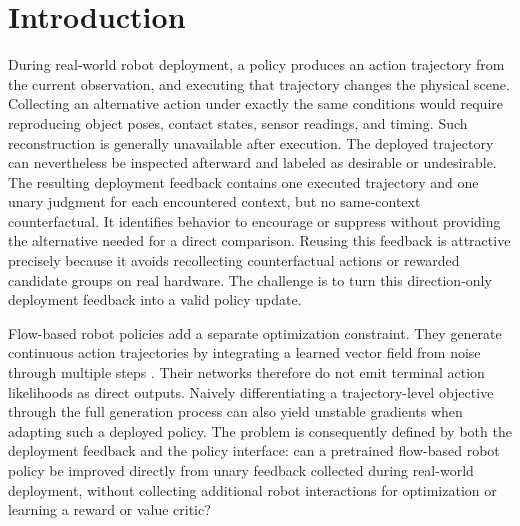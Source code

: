 \section{Introduction}

During real-world robot deployment, a policy produces an action trajectory from
the current observation, and executing that trajectory changes the physical
scene. Collecting an alternative action under exactly the same conditions would
require reproducing object poses, contact states, sensor readings, and timing.
Such reconstruction is generally unavailable after execution. The deployed
trajectory can nevertheless be inspected afterward and labeled as desirable or
undesirable. The resulting deployment feedback contains one executed trajectory
and one unary judgment for each encountered context, but no same-context
counterfactual. It identifies behavior to encourage or suppress without
providing the alternative needed for a direct comparison. Reusing this feedback
is attractive precisely because it avoids recollecting counterfactual actions
or rewarded candidate groups on real hardware. The challenge is to turn this
direction-only deployment feedback into a valid policy update.

Flow-based robot policies add a separate optimization constraint. They generate
continuous action trajectories by integrating a learned vector field from noise
through multiple steps \cite{lipman2023flowmatching,chi2023diffusionpolicy}.
Their networks therefore do not emit terminal action likelihoods as direct
outputs. Naively differentiating a trajectory-level objective through the full
generation process can also yield unstable gradients when adapting such a
deployed policy. The problem is consequently defined by both the deployment
feedback and the policy interface: can a pretrained flow-based robot
policy be improved directly from unary feedback collected during real-world
deployment, without collecting additional robot interactions for optimization
or learning a reward or value critic?

